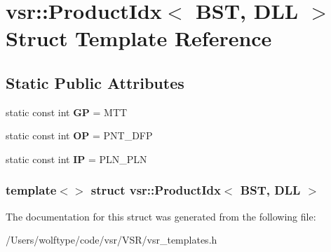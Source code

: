 \hypertarget{structvsr_1_1_product_idx_3_01_b_s_t_00_01_d_l_l_01_4}{\section{vsr\-:\-:Product\-Idx$<$ B\-S\-T, D\-L\-L $>$ Struct Template Reference}
\label{structvsr_1_1_product_idx_3_01_b_s_t_00_01_d_l_l_01_4}
}
\subsection*{Static Public Attributes}
\begin{DoxyCompactItemize}
\item 
\hypertarget{structvsr_1_1_product_idx_3_01_b_s_t_00_01_d_l_l_01_4_a0352ac660392604cbfc2237d18911982}{static const int {\bfseries G\-P} = M\-T\-T}\label{structvsr_1_1_product_idx_3_01_b_s_t_00_01_d_l_l_01_4_a0352ac660392604cbfc2237d18911982}

\item 
\hypertarget{structvsr_1_1_product_idx_3_01_b_s_t_00_01_d_l_l_01_4_ad1afcca2811d10b18dc23fd0a0947f92}{static const int {\bfseries O\-P} = P\-N\-T\-\_\-\-D\-F\-P}\label{structvsr_1_1_product_idx_3_01_b_s_t_00_01_d_l_l_01_4_ad1afcca2811d10b18dc23fd0a0947f92}

\item 
\hypertarget{structvsr_1_1_product_idx_3_01_b_s_t_00_01_d_l_l_01_4_ae903820124172f657502177c31a82989}{static const int {\bfseries I\-P} = P\-L\-N\-\_\-\-P\-L\-N}\label{structvsr_1_1_product_idx_3_01_b_s_t_00_01_d_l_l_01_4_ae903820124172f657502177c31a82989}

\end{DoxyCompactItemize}
\subsubsection*{template$<$$>$ struct vsr\-::\-Product\-Idx$<$ B\-S\-T, D\-L\-L $>$}



The documentation for this struct was generated from the following file\-:\begin{DoxyCompactItemize}
\item 
/\-Users/wolftype/code/vsr/\-V\-S\-R/vsr\-\_\-templates.\-h\end{DoxyCompactItemize}
